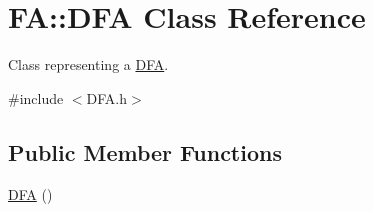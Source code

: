 \hypertarget{classFA_1_1DFA}{\section{F\-A\-:\-:D\-F\-A Class Reference}
\label{classFA_1_1DFA}
}


Class representing a \hyperlink{classFA_1_1DFA}{D\-F\-A}.  




{\ttfamily \#include $<$D\-F\-A.\-h$>$}

\subsection*{Public Member Functions}
\begin{DoxyCompactItemize}
\item 
\hypertarget{classFA_1_1DFA_a96ba094cdfc8c20eca44f52e978674e6}{\hyperlink{classFA_1_1DFA_a96ba094cdfc8c20eca44f52e978674e6}{D\-F\-A} ()}\label{classFA_1_1DFA_a96ba094cdfc8c20eca44f52e978674e6}


\end{DoxyCompactItemize}
